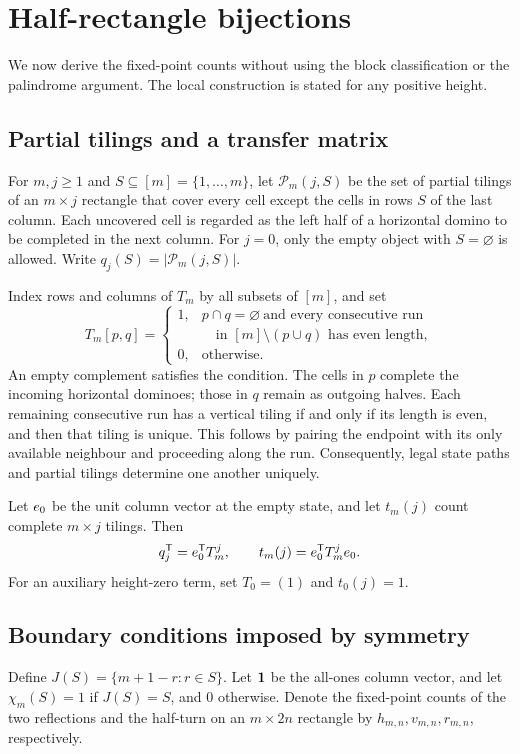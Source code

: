 \section{Half-rectangle bijections}\label{sec:half}
We now derive the fixed-point counts without using the block
classification or the palindrome argument. The local construction
is stated for any positive height.

\subsection{Partial tilings and a transfer matrix}
For $m,j\ge1$ and $S\subseteq[m]=\{1,\ldots,m\}$,
let $\mathcal P_m(j,S)$ be the set of partial tilings of an
$m\times j$ rectangle that cover every cell except the cells in
rows $S$ of the last column.
Each uncovered cell is regarded as the left half of a horizontal
domino to be completed in the next column.
For $j=0$, only the empty object with $S=\varnothing$ is allowed.
Write $q_j(S)=|\mathcal P_m(j,S)|$.

Index rows and columns of $T_m$ by all subsets of $[m]$, and set
\begin{equation}\label{eq:Tm}
 T_m[p,q]=
 \begin{cases}
 1,&p\cap q=\varnothing\ \text{and every consecutive run}\\
   &\quad\text{in }[m]\setminus(p\cup q)\text{ has even length},\\
 0,&\text{otherwise}.
 \end{cases}
\end{equation}
An empty complement satisfies the condition.
The cells in $p$ complete the incoming horizontal dominoes;
those in $q$ remain as outgoing halves.
Each remaining consecutive run has a vertical tiling if and
only if its length is even, and then that tiling is unique.
This follows by pairing the endpoint with its only available
neighbour and proceeding along the run.
Consequently, legal state paths and partial tilings determine
one another uniquely.

Let $e_0$ be the unit column vector at the empty state, and
let $t_m(j)$ count complete $m\times j$ tilings. Then
\begin{equation}\label{eq:profile}
 q_j^{\mathsf T}=e_0^{\mathsf T}T_m^j,\qquad
 t_m(j)=e_0^{\mathsf T}T_m^je_0.
\end{equation}
For an auxiliary height-zero term, set $T_0=(1)$ and $t_0(j)=1$.

\subsection{Boundary conditions imposed by symmetry}
Define $J(S)=\{m+1-r:r\in S\}$.
Let $\boldsymbol{1}$ be the all-ones column vector, and let
$\chi_m(S)=1$ if $J(S)=S$, and $0$ otherwise.
Denote the fixed-point counts of the two reflections and the
half-turn on an $m\times2n$ rectangle by $h_{m,n},v_{m,n},r_{m,n}$,
respectively.

